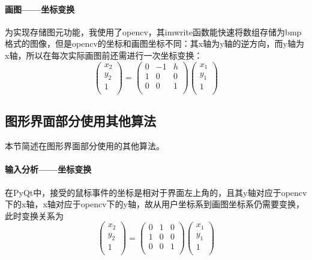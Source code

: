 \documentclass[a4paper,UTF8]{article}
\theoremstyle{definition}
\begin{document}
\paragraph{画图——坐标变换} 为实现存储图元功能，我使用了opencv，其imwrite函数能快速将数组存储为bmp格式的图像，但是opencv的坐标和画图坐标不同：其x轴为y轴的逆方向，而y轴为x轴，所以在每次实际画图前还需进行一次坐标变换：
\begin{equation}
\left(
\begin{array}{c}
x_2 \\
y_2 \\
1 \\
\end{array}
\right)
=\left(
\begin{array}{ccc}
0 & -1 & h \\
1 & 0 & 0 \\
0 & 0 & 1 \\
\end{array}
\right)
\left(
\begin{array}{c}
x_1 \\
y_1 \\
1 \\
\end{array}
\right)
\end{equation}
\subsection{图形界面部分使用其他算法}
本节简述在图形界面部分使用的其他算法。
\paragraph{输入分析——坐标变换}
在PyQt中，接受的鼠标事件的坐标是相对于界面左上角的，且其y轴对应于opencv下的x轴，x轴对应于opencv下的y轴，故从用户坐标系到画图坐标系仍需要变换，此时变换关系为
\begin{equation}
\left(
\begin{array}{c}
x_2 \\
y_2 \\
1 \\
\end{array}
\right)
=\left(
\begin{array}{ccc}
0 & 1 & 0 \\
1 & 0 & 0 \\
0 & 0 & 1 \\
\end{array}
\right)
\left(
\begin{array}{c}
x_1 \\
y_1 \\
1 \\
\end{array}
\right)
\end{equation}
\end{document}
